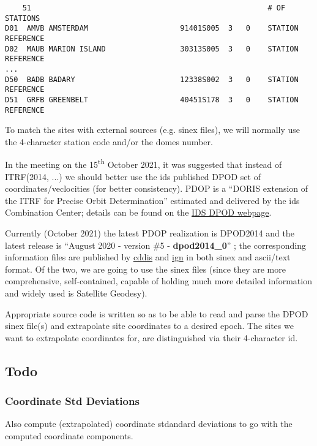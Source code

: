 \begin{adjustbox}{max width=\linewidth , fbox=0.5pt}
\begin{BVerbatim}
    51                                                      # OF STATIONS
D01  AMVB AMSTERDAM                     91401S005  3   0    STATION REFERENCE
D02  MAUB MARION ISLAND                 30313S005  3   0    STATION REFERENCE
...
D50  BADB BADARY                        12338S002  3   0    STATION REFERENCE 
D51  GRFB GREENBELT                     40451S178  3   0    STATION REFERENCE
\end{BVerbatim}
\end{adjustbox}

To match the sites with external sources (e.g. \gls{sinex} files), we will 
normally use the 4-character station code and/or the domes number.

In the meeting on the 15\textsuperscript{th} October 2021, it was suggested 
that instead of ITRF(2014, ...) we should better use the \gls{ids} published DPOD 
set of coordinates/veclocities (for better consistency). PDOP is a 
``DORIS extension of the ITRF for Precise Orbit Determination'' estimated and 
delivered by the \gls{ids} Combination Center; details can be found on the 
\href{https://ids-doris.org/analysis-coordination/combination/dpod.html}{IDS DPOD webpage}.

Currently (October 2021) the latest PDOP realization is DPOD2014 
\cite{Moreaux2019118} and the latest release is 
``August 2020 - version \#5 - \textbf{dpod2014\_0}'' \cite{Moreaux2020};
the corresponding information files are published by 
\href{ftp://cddis.gsfc.nasa.gov/pub/doris/products/dpod/dpod2014/}{cddis} and
\href{ftp://doris.ensg.ign.fr/pub/doris/products/dpod/dpod2014/}{ign} in both 
\gls{sinex} and ascii/text format. Of the two, we are going to use the 
\gls{sinex} files (since they are more comprehensive, self-contained, capable 
of holding much more detailed information and widely used is Satellite Geodesy). 

Appropriate source code is written so as to be able to read and parse the DPOD 
\gls{sinex} file(s) and extrapolate site coordinates to a desired epoch. The 
sites we want to extrapolate coordinates for, are distinguished via their 
4-character id.

\subsection{Todo}
\subsubsection{Coordinate Std Deviations}
Also compute (extrapolated) coordinate stdandard deviations to go with the 
computed coordinate components.

